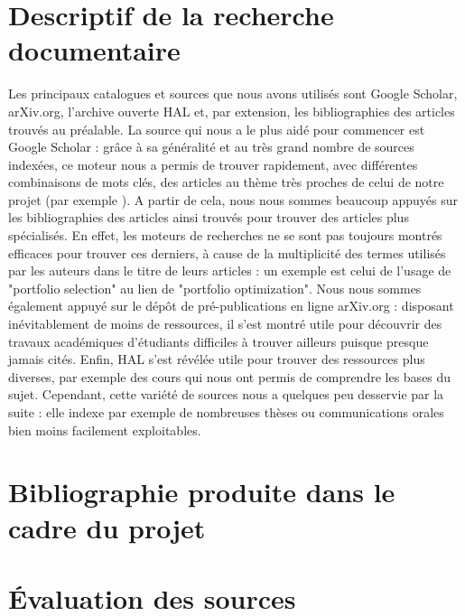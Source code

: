 \documentclass[a4paper]{article}
\begin{document}
\section{Descriptif de la recherche documentaire}

Les principaux catalogues et sources que nous avons utilisés sont Google Scholar, arXiv.org, l'archive ouverte HAL et, par extension, les bibliographies des articles trouvés au préalable. La source qui nous a le plus aidé pour commencer est Google Scholar : grâce à sa généralité et au très grand nombre de sources indexées, ce moteur nous a permis de trouver rapidement, avec différentes combinaisons de mots clés, des articles au thème très proches de celui de notre projet (par exemple \cite{Jiang2017}). A partir de cela, nous nous sommes beaucoup appuyés sur les bibliographies des articles ainsi trouvés pour trouver des articles plus spécialisés. En effet, les moteurs de recherches ne se sont pas toujours montrés efficaces pour trouver ces derniers, à cause de la multiplicité des termes utilisés par les auteurs dans le titre de leurs articles : un exemple est celui de l'usage de "portfolio selection" au lien de "portfolio optimization". Nous nous sommes également appuyé sur le dépôt de pré-publications en ligne arXiv.org : disposant inévitablement de moins de ressources, il s'est montré utile pour découvrir des travaux académiques d'étudiants difficiles à trouver ailleurs puisque presque jamais cités. Enfin, HAL s'est révélée utile pour trouver des ressources plus diverses, par exemple des cours qui nous ont permis de comprendre les bases du sujet. Cependant, cette variété de sources nous a quelques peu desservie par la suite : elle indexe par exemple de nombreuses thèses ou communications orales bien moins facilement exploitables.

\section{Bibliographie produite dans le cadre du projet}

\nocite{*}
\printbibliography[heading=none]

\section{Évaluation des sources}

\textbf{}
\end{document}
